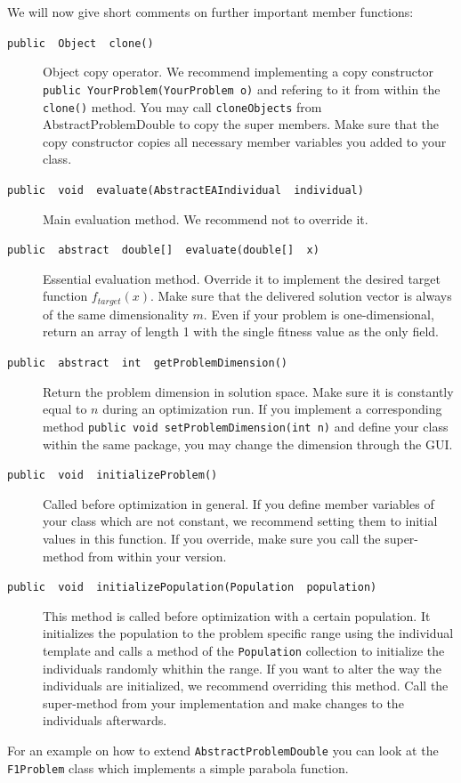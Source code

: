 We will now give short comments on further important member functions:
\begin{description}
\item [{\texttt{public ~Object ~clone()}}] Object copy operator. We recommend
implementing a copy constructor \texttt{public YourProblem(YourProblem
o)} and refering to it from within the \texttt{clone()} method. You
may call \texttt{cloneObjects} from AbstractProblemDouble to copy
the super members. Make sure that the copy constructor copies all
necessary member variables you added to your class.
\item [{\texttt{public ~void ~evaluate(AbstractEAIndividual ~individual)}}] Main
evaluation method. We recommend not to override it.
\item [{\texttt{public ~abstract ~double{[}{]} ~evaluate(double{[}{]} ~x)}}] Essential
evaluation method. Override it to implement the desired target function
$f_{target}(x)$. Make sure that the delivered solution vector is
always of the same dimensionality $m$. Even if your problem is one-dimensional,
return an array of length 1 with the single fitness value as the only
field.
\item [{\texttt{public ~abstract ~int ~getProblemDimension()}}] Return
the problem dimension in solution space. Make sure it is constantly
equal to $n$ during an optimization run. If you implement a corresponding
method \texttt{public void setProblemDimension(int n)} and define
your class within the same package, you may change the dimension through
the GUI.
\item [{\texttt{public ~void ~initializeProblem()}}] Called before optimization
in general. If you define member variables of your class which are
not constant, we recommend setting them to initial values in this
function. If you override, make sure you call the super-method from
within your version.
\item [{\texttt{public ~void ~initializePopulation(Population ~population)}}] This
method is called before optimization with a certain population. It
initializes the population to the problem specific range using the
individual template and calls a method of the \texttt{Population}
collection to initialize the individuals randomly whithin the range.
If you want to alter the way the individuals are initialized, we recommend
overriding this method. Call the super-method from your implementation
and make changes to the individuals afterwards.
\end{description}
For an example on how to extend \texttt{AbstractProblemDouble} you
can look at the \texttt{F1Problem} class which implements a simple
parabola function.


